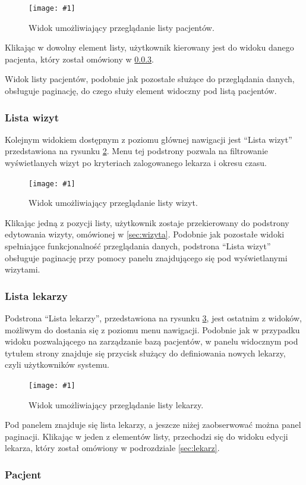 \documentclass[11pt]{aghdpl}
\newcommand{\fullWidthPicture}[2]{
\begin{figure}[h!]
	\centering
		\texttt{[image: \#1]}
	\caption{#2}
	\label{fig:#1}
\end{figure}
}
\begin{document}
\fullWidthPicture{pacjenci}{Widok umożliwiający przeglądanie listy pacjentów.}

Klikając w dowolny element listy, użytkownik kierowany jest do widoku danego pacjenta, który został omówiony w \ref{sec:pacjent}.

Widok listy pacjentów, podobnie jak pozostałe służące do przeglądania danych, obsługuje paginację, do czego służy element widoczny pod listą pacjentów.

\subsubsection{Lista wizyt}
\label{sec:listaWizyt}

Kolejnym widokiem dostępnym z poziomu głównej nawigacji jest ``Lista wizyt'' przedstawiona na rysunku \ref{fig:wizyty}. Menu tej podstrony pozwala na filtrowanie wyświetlanych wizyt po kryteriach zalogowanego lekarza i okresu czasu.

\fullWidthPicture{wizyty}{Widok umożliwiający przeglądanie listy wizyt.}

Klikając jedną z pozycji listy, użytkownik zostaje przekierowany do podstrony edytowania wizyty, omówionej w \ref{sec:wizyta}. Podobnie jak pozostałe widoki spełniające funkcjonalność przeglądania danych, podstrona ``Lista wizyt'' obsługuje paginację przy pomocy panelu znajdującego się pod wyświetlanymi wizytami. 

\subsubsection{Lista lekarzy}
\label{sec:listaLekarzy}

Podstrona ``Lista lekarzy'', przedstawiona na rysunku \ref{fig:lekarze}, jest ostatnim z widoków, możliwym do dostania się z poziomu menu nawigacji. Podobnie jak w przypadku widoku pozwalającego na zarządzanie bazą pacjentów, w panelu widocznym pod tytułem strony znajduje się przycisk służący do definiowania nowych lekarzy, czyli użytkowników systemu.

\fullWidthPicture{lekarze}{Widok umożliwiający przeglądanie listy lekarzy.}

Pod panelem znajduje się lista lekarzy, a jeszcze niżej zaobserwować można panel paginacji. Klikając w jeden z elementów listy, przechodzi się do widoku edycji lekarza, który został omówiony w podrozdziale \ref{sec:lekarz}.

\subsubsection{Pacjent}
\label{sec:pacjent}
\end{document}
